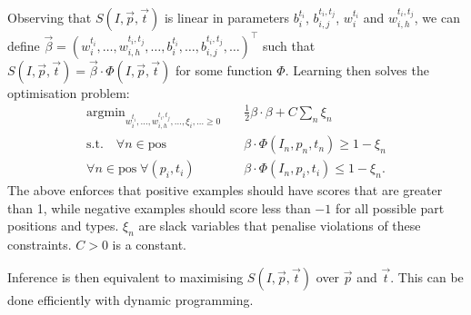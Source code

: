 \documentclass[11pt, oneside]{report}
\DeclareMathOperator*{\argmin}{argmin}
\begin{document}
    Observing that $S(I,\vec p, \vec t)$ is linear in parameters $b_i^{t_i}$, $b_{i,j}^{t_i,t_j}$, $w_i^{t_i}$ and $w_{i,h}^{t_i,t_j}$, we can define $\vec\beta = \left(w_i^{t_i}, \dots, w_{i,h}^{t_i,t_j}, \dots, b_i^{t_i}, \dots, b_{i,j}^{t_i,t_j}, \dots\right)^\intercal$ such that $S\left(I, \vec p, \vec t\right)=\vec\beta\cdot\Phi\left(I, \vec p, \vec t\right)$ for some function $\Phi$. Learning then solves the optimisation problem: \begin{align*}
        \argmin_{w_i^{t_i}, \dots, w_{i,h}^{t_i,t_j}, \dots, \xi_i, \ldots \geq 0} &\quad\frac12\beta\cdot\beta+C\sum_n\xi_n\\
        \textrm{s.t.}\quad\forall n \in \textrm{pos} & \quad\beta\cdot\Phi(I_n, p_n, t_n) \geq 1-\xi_n \\
        \forall n \in \textrm{pos} \;\forall (p_i, t_i) & \quad\beta\cdot\Phi(I_n, p_i, t_i) \leq 1-\xi_n\textrm{.}
    \end{align*}
    The above enforces that positive examples should have scores that are greater than 1, while negative examples should score less than $-1$ for all possible part positions and types. $\xi_n$ are slack variables that penalise violations of these constraints. $C>0$ is a constant.

    Inference is then equivalent to maximising $S(I,\vec p, \vec t)$ over $\vec p$ and $\vec t$. This can be done efficiently with dynamic programming.
\end{document}
